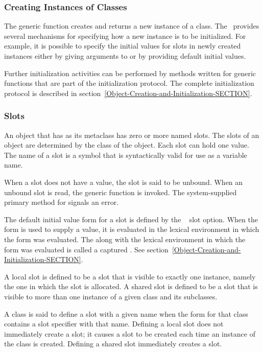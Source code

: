 \subsubsection{Creating Instances of Classes}

The generic function  creates and returns a new
instance of a class.  The \OS\ provides several mechanisms for
specifying how a new instance is to be initialized.  For example, it
is possible to specify the initial values for slots in newly created
instances either by giving arguments to  or by
providing default initial values.

Further initialization activities
can be performed by methods written for generic functions that are
part of the initialization protocol.  The complete initialization
protocol is described in section~\ref{Object-Creation-and-Initialization-SECTION}.

\subsubsection{Slots}

An object that has  as its metaclass has zero or
more named slots.  The slots of an object are determined by the class
of the object.  Each slot can hold one value.  The name of a slot is a
symbol that is syntactically valid for use as a variable
name.

When a slot does not have a value, the slot is said to be {\bit
unbound}.  When an unbound slot is read, the generic
function  is invoked. The system-supplied primary method
for  signals an error.

The default initial value form for a slot is defined by the \hbox{
} slot option. When the  form is used to
supply a value, it is evaluated in the lexical environment in which
the  form was evaluated. The  along with
the lexical environment in which the  form was evaluated
is called a {\bit captured\/} .
See section~\ref{Object-Creation-and-Initialization-SECTION}.

A {\bit local slot\/} is defined to be a slot that is visible to exactly
one instance, namely the one in which the slot is allocated.  A {\bit
shared slot\/} is defined to be a slot that is visible to more than one
instance of a given class and its subclasses.

A class is said to {\bit define\/} a slot with a given name when
the  form for that class contains a slot specifier with
that name.  Defining a local slot does not immediately create a slot;
it causes a slot to be created each time an instance of the class is
created.  Defining a shared slot immediately creates a slot.

